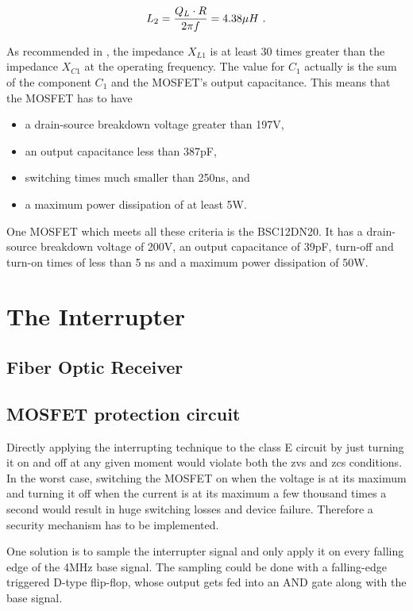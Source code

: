 \begin{equation*}
    L_2 = \frac{Q_L \cdot R}{2 \pi f} = 4.38\mu H\textnormal{ .}
\end{equation*}
    
As recommended in , the impedance \(X_{L1}\) is at least 30 times greater than the impedance \(X_{C1}\) at the operating frequency. The value for \(C_1\) actually is the sum of the component \(C_1\) and the MOSFET's output capacitance. This means that the MOSFET has to have

\begin{itemize}
    \item a drain-source breakdown voltage greater than 197V,
    \item an output capacitance less than 387pF,
    \item switching times much smaller than 250ns, and
    \item a maximum power dissipation of at least 5W.
\end{itemize}

One MOSFET which meets all these criteria is the BSC12DN20. It has a drain-source breakdown voltage of 200V, an output capacitance of 39pF, turn-off and turn-on times of less than 5 ns and a maximum power dissipation of 50W.
    
\section{The Interrupter}

\subsection{Fiber Optic Receiver}

\subsection{MOSFET protection circuit}

Directly applying the interrupting technique to the class E circuit by just turning it on and off at any given moment would violate both the \gls{zvs} and \gls{zcs} conditions. In the worst case, switching the MOSFET on when the voltage is at its maximum and turning it off when the current is at its maximum a few thousand times a second would result in huge switching losses and device failure. Therefore a security mechanism has to be implemented.

One solution is to sample the interrupter signal and only apply it on every falling edge of the 4MHz base signal. The sampling could be done with a falling-edge triggered D-type flip-flop, whose output gets fed into an AND gate along with the base signal.

